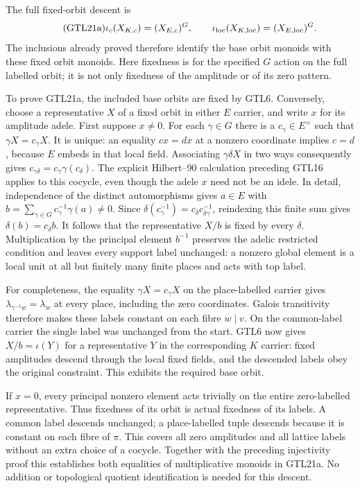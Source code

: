 The full fixed-orbit descent is
\begin{equation}\tag{GTL21a}
 \iota_c(X_{K,c})=(X_{E,c})^G,
 \qquad
 \iota_{\rm loc}(X_{K,\mathrm{loc}})
                         =(X_{E,\mathrm{loc}})^G.
\end{equation}
The inclusions already proved therefore identify the base orbit
monoids with these fixed orbit monoids. Here fixedness is for
the specified $G$ action on the full labelled orbit; it is not
only fixedness of the amplitude or of its zero pattern.

To prove GTL21a, the included base orbits are fixed by GTL6.
Conversely, choose a representative $X$ of a fixed orbit in
either $E$ carrier, and write $x$ for its amplitude adele.
First suppose $x\ne0$. For each $\gamma\in G$ there is a
$c_\gamma\in E^\times$ such that $\gamma X=c_\gamma X$.
It is unique: an equality $c x=d x$ at a nonzero coordinate
implies $c=d$, because $E$ embeds in that local field.
Associating $\gamma\delta X$ in two ways consequently gives
$c_{\gamma\delta}=c_\gamma\gamma(c_\delta)$.
The explicit Hilbert--90 calculation preceding GTL16 applies
to this cocycle, even though the adele $x$ need not be an idele.
In detail, independence of the distinct automorphisms gives
$a\in E$ with
$b=\sum_{\gamma\in G}c_\gamma^{-1}\gamma(a)\ne0$.
Since
$\delta(c_\gamma^{-1})
       =c_\delta c_{\delta\gamma}^{-1}$,
reindexing this finite sum gives $\delta(b)=c_\delta b$.
It follows that the representative $X/b$ is fixed by every
$\delta$. Multiplication by the principal element $b^{-1}$
preserves the adelic restricted condition and leaves every
support label unchanged: a nonzero global element is a local
unit at all but finitely many finite places and acts with top
label.

For completeness, the equality $\gamma X=c_\gamma X$ on the
place-labelled carrier gives
$\lambda_{\gamma^{-1}w}=\lambda_w$ at every place, including
the zero coordinates. Galois transitivity therefore makes
these labels constant on each fibre $w\mid v$. On the
common-label carrier the single label was unchanged from the
start. GTL6 now gives $X/b=\iota(Y)$ for a representative $Y$
in the corresponding $K$ carrier: fixed amplitudes descend
through the local fixed fields, and the descended labels obey
the original constraint. This exhibits the required base orbit.

If $x=0$, every principal nonzero element acts trivially on the
entire zero-labelled representative. Thus fixedness of its
orbit is actual fixedness of its labels. A common label descends
unchanged; a place-labelled tuple descends because it is
constant on each fibre of $\pi$. This covers all zero amplitudes
and all lattice labels without an extra choice of a cocycle.
Together with the preceding injectivity proof this establishes
both equalities of multiplicative monoids in GTL21a. No addition
or topological quotient identification is needed for this descent.

